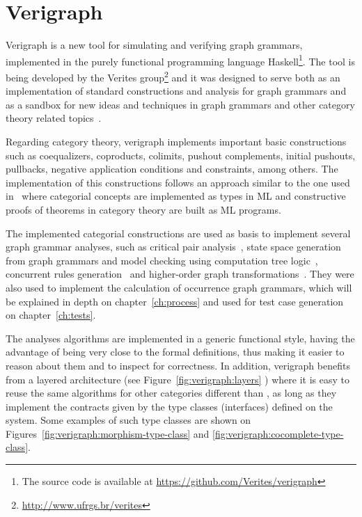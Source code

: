 \chapter{Verigraph}\label{ch:verigraph}

Verigraph is a new tool for simulating and verifying graph grammars, implemented in the purely functional programming language Haskell\footnote{The source code is available at \url{https://github.com/Verites/verigraph}}. The tool is being developed by the Verites group\footnote{\url{http://www.ufrgs.br/verites}} and it was designed to serve both as an implementation of standard constructions and analysis for graph grammars and as a sandbox for new ideas and techniques in graph grammars and other category theory related topics~\cite{BezerraETMF2016,Costa2016,CostaETMF2016, Becker2014}.

Regarding category theory, verigraph implements important basic constructions such as coequalizers, coproducts, colimits, pushout complements, initial pushouts, pullbacks, negative application conditions and constraints, among others. The implementation of this constructions follows an approach similar to the one used in~\cite{Rydeheard1988} where categorial concepts are implemented as types in ML and constructive proofs of theorems in category theory are built as ML programs.

The implemented categorial constructions are used as basis to implement several graph grammar analyses, such as critical pair analysis~\cite{Lambers2006}, state space generation from graph grammars and model checking using computation tree logic~\cite{Becker2014}, concurrent rules generation~\cite{BezerraETMF2016} and higher-order graph transformations~\cite{Machado2015}. They were also used to implement the calculation of occurrence graph grammars, which will be explained in depth on
chapter~\ref{ch:process} and used for test case generation on chapter~\ref{ch:tests}.

The analyses algorithms are implemented in a generic functional style, having the advantage of being very close to the formal definitions, thus making it easier to reason about them and to inspect for correctness. In addition, verigraph benefits from a layered architecture (see Figure~\ref{fig:verigraph:layers} ) where it is easy to reuse the same algorithms for other categories different than , as long as they implement the contracts given by the type
classes (interfaces) defined on the system. Some examples of such type classes are shown on
Figures~\ref{fig:verigraph:morphism-type-class} and \ref{fig:verigraph:cocomplete-type-class}.

